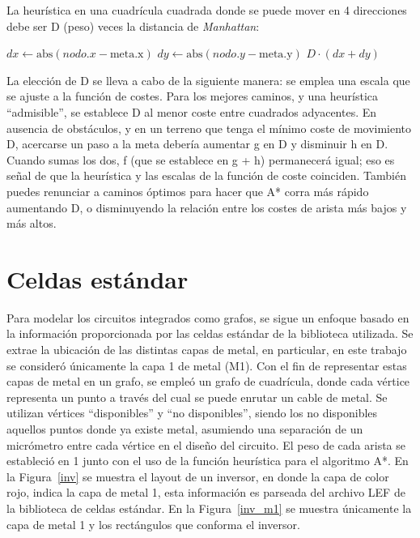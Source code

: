 \documentclass[reprint,amsmath,amssymb,aps]{revtex4-2}
\begin{document}
La heurística en una cuadrícula cuadrada donde se puede mover en 4 direcciones debe ser D (peso) veces la distancia de \textit{Manhattan}:

\begin{algorithmic}
        \State $dx \gets \text{abs}(nodo.x - \text{meta.x})$
        \State $dy \gets \text{abs}(nodo.y - \text{meta.y})$
        \State \Return $D \cdot (dx + dy)$
    \EndFunction
\end{algorithmic}


La elección de D se lleva a cabo de la siguiente manera: se emplea una escala que se ajuste a la función de costes. Para los mejores caminos, y una heurística ``admisible'', se establece D al menor coste entre cuadrados adyacentes. En ausencia de obstáculos, y en un terreno que tenga el mínimo coste de movimiento D, acercarse un paso a la meta debería aumentar g en D y disminuir h en D. Cuando sumas los dos, f (que se establece en g + h) permanecerá igual; eso es señal de que la heurística y las escalas de la función de coste coinciden. También puedes renunciar a caminos óptimos para hacer que A* corra más rápido aumentando D, o disminuyendo la relación entre los costes de arista más bajos y más altos.

\section{Celdas estándar}
Para modelar los circuitos integrados como grafos, se sigue un enfoque basado en la información proporcionada por las celdas estándar de la biblioteca utilizada. Se extrae la ubicación de las distintas capas de metal, en particular, en este trabajo se consideró únicamente la capa 1 de metal (M1). Con el fin de representar estas capas de metal en un grafo, se empleó un grafo de cuadrícula, donde cada vértice representa un punto a través del cual se puede enrutar un cable de metal. Se utilizan vértices ``disponibles'' y ``no disponibles'', siendo los no disponibles aquellos puntos donde ya existe metal, asumiendo una separación de un micrómetro entre cada vértice en el diseño del circuito. El peso de cada arista se estableció en 1 junto con el uso de la función heurística para el algoritmo A*. En la Figura~\ref{inv} se muestra el layout de un inversor, en donde la capa de color rojo, indica la capa de metal 1, esta información es parseada del archivo LEF de la biblioteca de celdas estándar. En la Figura~\ref{inv_m1} se muestra únicamente la capa de metal 1 y los rectángulos que conforma el inversor.
\end{document}
